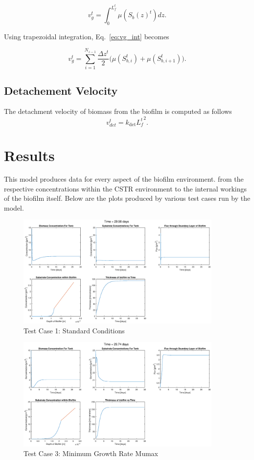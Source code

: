 \documentclass[letterpaper, twoside]{article}
\numberwithin{equation}{section}
\begin{document}
\begin{equation}
  \label{eq:vg_int}
  {v_g^{t}}={\int_{0}^{L_f^{t}}\mu(S_b(z)^{t})dz}.
\end{equation}

Using trapezoidal integration, Eq.~\ref{eq:vg_int} becomes

\begin{equation}
  \label{eq:vg_sum}
  {v_g^{t}}={\sum_{i=1}^{N_{z-1}}  {\frac{\Delta {z^{t}}}{2}}  ( {\mu({S_{b,i}^{t}})+\mu({S_{b,i+1}^{t}})}}).
\end{equation}

\subsection{Detachement Velocity}
The detachment velocity of biomass from the biofilm is computed as follows
\begin{equation}
  \label{eq:vdet2}
  {v_{det}^{t}}={k_{\mathrm{det}}{L^t_f}^2}.
\end{equation}

\section{Results}
This model produces data for every aspect of the biofilm environment. from the respective concentrations within the CSTR environment to the internal workings of the biofilm itself. Below are the plots produced by various test cases run by the model.

\begin{figure}[H]
  \centering
  \includegraphics[read=eps, width=4in]{Testcase1_figure.eps}
  \caption{Test Case 1: Standard Conditions}
\end{figure}

\begin{figure}[H]
  \centering
  \includegraphics[read=eps, width=4in]{Testcase3_figure.eps}
  \caption{Test Case 3: Minimum Growth Rate Mumax}
\end{figure}
\end{document}
